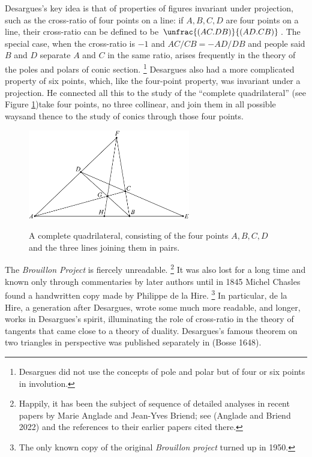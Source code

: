 Desargues's key idea is that of properties of figures invariant under
projection, such as the cross-ratio
%
of four points on a line: if $A,
B, C, D$ are four points on a line, their cross-ratio can be defined to be
$\unfrac{(AC.DB)}{(AD.CB)}$. The special case,  when the cross-ratio
is $-1$ and $AC/CB=-AD/DB$ and people said $B$ and $D$ separate $A$
and $C$ in the same ratio, arises frequently in the theory of the
poles and polars of conic section.%
%
\footnote{Desargues did not use the
  concepts of pole and polar but of four or six points in involution.}
%
Desargues also had a more complicated property of six points, which,
like the four-point property, was invariant under a projection. He
connected all this to the study of the ``complete quadrilateral''
%
(see
Figure \ref{figCompleteQuad})\emdash take four points, no three
collinear, and join them in all possible ways\emdash  and thence to
the study of conics through those four points.

\begin{figure}
\includegraphics[width=200pt]{main/CompleteQuad3}
\caption{A complete quadrilateral, consisting of the four points $A, B,
C, D$ and the three lines joining them in pairs.}
%
\label{figCompleteQuad}
\end{figure}


The  \emph{Brouillon Project} is fiercely unreadable.%
%
\footnote{Happily,
it has been the subject of sequence of detailed analyses in recent papers
by Marie  Anglade
%
and Jean-Yves Briend;
%
 see (Anglade and Briend 2022)
and the references to their earlier papers cited there.} 
%
It was also lost
for a long time and known only through commentaries by later authors
until in 1845 Michel Chasles
%
found a handwritten copy made by Philippe
de la
%
Hire.%
\footnote{The only known copy of the original \emph{Brouillon
project} turned up in 1950.}
%
In particular, de la Hire, a generation after
Desargues, wrote some much more readable, and longer, works in Desargues's
spirit, illuminating the role of cross-ratio in the theory of tangents
that came close to a theory of duality. Desargues's famous theorem
%
on two triangles in perspective was published separately in (Bosse 1648).

